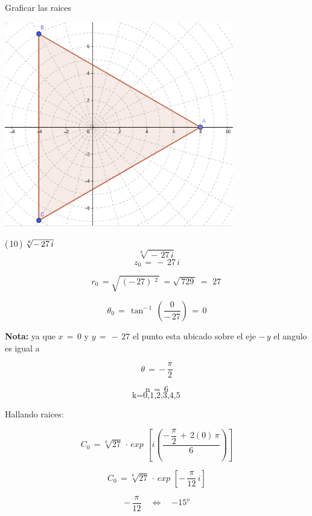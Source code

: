 \documentclass[a4paper,11pt,openany]{book}
\begin{document}
\textcolor{ao(english)}{} Graficar las raices

\begin{center}
    \includegraphics[width=10cm]{Gra-Ej-9.png}
\end{center}

\textcolor{ao(english)}{(\,10\,)} $\bf{\sqrt[6]{-\,27\,i}}$\\

$$\sqrt[6]{\,-\,27\,i}$$
$$z_0\,= \,-\,27\,i$$

\textcolor{ao(english)}{}

$$r_0\,=\sqrt{\,(-\,27)\,^{\,2}\,}\,=\sqrt{\,729\,}\,=\,\boxed{\,27\,}$$

\textcolor{ao(english)}{}

$$\theta_0\,=\,\tan^{-\,1}\,\left(\dfrac{0}{-\,27}\right)\,=\,0$$

\textbf{Nota:} ya que $x\,=\,0$ y $y\,=\,-\,27$ el punto esta ubicado sobre el eje $-\,y$ el angulo es igual a

$$\theta\,=\,\boxed{-\,\dfrac{\pi}{2}}$$

$$\text{n}\,=\,6$$
$$\text{k={0,1,2,3,4,5}}\,$$

Hallando raices:\\


\textcolor{ao(english)}{}

$$C_0\,=\sqrt[6]{27}\,\cdot\,exp\,{\,\left[i\left(  \dfrac{-\,\dfrac{\pi}{2}\,+\,2(0)\,\pi}{6}\right)\right]}$$

$$C_0\,=\sqrt[6]{27}\,\cdot\,exp\,{\,\left[-\,\dfrac{\pi}{12}\,i\right]}$$

$$-\,\dfrac{\pi}{12} \quad\iff\quad \boxed{-15^{o}}$$
\end{document}
